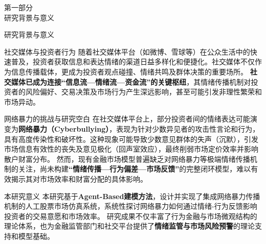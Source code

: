 \begin{frame}
    \begin{center}
        \textcolor{NJU_purple}{\Large 第一部分} \\[1.5em]
        \textcolor{NJU_purple}{\Huge 研究背景与意义}
    \end{center}
\end{frame}


\begin{frame}{研究背景与意义}

    \setlength{\parskip}{0.2em} %
    \footnotesize %
    
    \begin{block}{社交媒体与投资者行为}
    随着社交媒体平台（如微博、雪球等）在公众生活中的快速普及，投资者获取信息和表达情绪的渠道日益多样化和便捷化。社交媒体不仅作为信息传播载体，更成为投资者观点碰撞、情绪共鸣及群体决策的重要场所。
    \alert{\textbf{社交媒体已成为连接“信息流—情绪流—资金流”的关键枢纽}}，其情绪传播机制对投资者的风险偏好、交易决策及市场行为产生深远影响，甚至可能引发非理性繁荣和市场异动。
    \end{block}
    
    \vspace{0.1cm}
    
    \begin{block}{网络暴力的挑战与研究空白}
    在社交媒体平台上，部分投资者间的情绪表达可能演变为\alert{\textbf{网络暴力（Cyberbullying）}}，表现为针对少数异见者的攻击性言论和行为，具有高度传染性和破坏性。这种现象可能导致少数意见群体的失声（沉默），引发市场信息有效性的丧失及意见极化（回声室效应），最终削弱市场定价效率并影响散户财富分布。
    然而，现有金融市场模型普遍缺乏对网络暴力等极端情绪传播机制的关注，尚未构建\alert{\textbf{“情绪传播—行为偏差—市场反馈”}}的完整闭环模型，难以有效揭示其对市场效率和财富分配的具体影响。
    \end{block}
    
    \vspace{0.1cm}
    
    \begin{block}{本研究意义}
    本研究基于\alert{\textbf{Agent-Based建模方法}}，设计并实现了集成网络暴力传播机制的人工股票市场仿真系统，系统性探讨网络暴力如何通过情绪-行为反馈影响投资者的交易意愿和市场效率。
    研究成果不仅丰富了行为金融与市场微观结构的理论体系，也为金融监管部门和社交平台提供了\alert{\textbf{情绪监管与市场风险预警}}的理论支持和模型基础。
    \end{block}
    
    \end{frame}
    